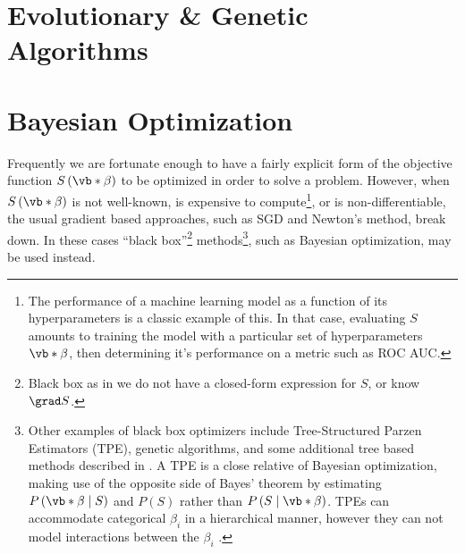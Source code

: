 \section{Evolutionary \& Genetic Algorithms}
\label{opt:evo}

\section{Bayesian Optimization}
\label{opt:BO}

Frequently we are fortunate enough to have a fairly explicit form of
the objective function $S\left(\vb*{\beta}\right)$ to be optimized in order to solve a problem.
However, when $S\left(\vb*{\beta}\right)$ is not well-known,
is expensive to compute\footnote{The performance of a machine learning model as a function of its hyperparameters is a classic example of this.
In that case, evaluating $S$ amounts to training the model with a particular set of hyperparameters $\vb*{\beta}$,
then determining it's performance on a metric such as ROC AUC.}, or is non-differentiable,
the usual gradient based approaches, such as SGD and Newton's method, break down.
In these cases ``black box''\footnote{Black box as in
we do not have a closed-form expression for $S$, or know $\grad S$.} methods\footnote{Other examples of black box optimizers include
Tree-Structured Parzen Estimators (TPE),
genetic algorithms,
and some additional tree based methods described in \cite{Hutter2011,Hutter2014}.
A TPE is a close relative of Bayesian optimization, making use of the opposite side of Bayes' theorem by
estimating $P\left(\vb*{\beta} \mid S\right)$ and $P\left(S\right)$ rather than $P\left(S \mid \vb*{\beta}\right)$.
TPEs can accommodate categorical $\beta_{i}$ in a hierarchical manner,
however they can not model interactions between the $\beta_{i}$ \cite{bissuel_2019,NIPS2011_4443}.},
such as Bayesian optimization, may be used instead.

